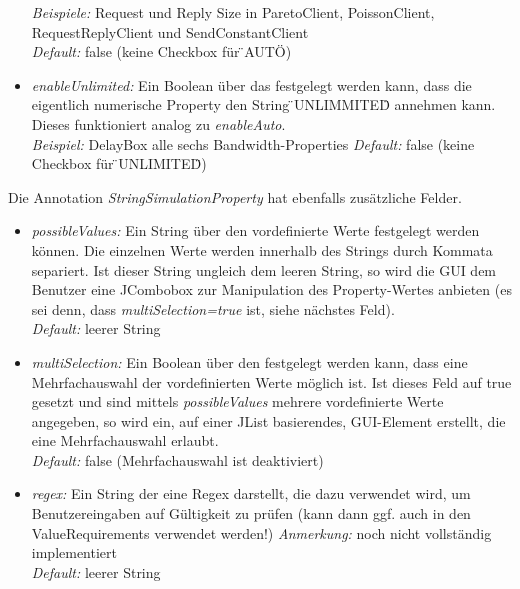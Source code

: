 \documentclass[a4paper, 11pt]{article} %
\begin{document}
\begin{itemize}
	\emph{Beispiele:} Request und Reply Size in ParetoClient, PoissonClient, RequestReplyClient und SendConstantClient\\
	\emph{Default:} false (keine Checkbox für \"{}AUTO\"{}) 
	\item \emph{enableUnlimited:} Ein Boolean über das festgelegt werden kann, dass die eigentlich numerische Property den String \"{}UNLIMMITED\"{} annehmen kann. Dieses funktioniert analog zu \emph{enableAuto}.\\
	\emph{Beispiel:} DelayBox alle sechs Bandwidth-Properties
	\emph{Default:} false (keine Checkbox für \"{}UNLIMITED\"{})
\end{itemize}

Die Annotation \emph{StringSimulationProperty} hat ebenfalls zusätzliche Felder.
\begin{itemize}
	\item \emph{possibleValues:} Ein String über den vordefinierte Werte festgelegt werden können. Die einzelnen Werte werden innerhalb des Strings durch Kommata separiert. Ist dieser String ungleich dem leeren String, so wird die GUI dem Benutzer eine JCombobox zur Manipulation des Property-Wertes anbieten (es sei denn, dass \emph{multiSelection=true} ist, siehe nächstes Feld).\\
	\emph{Default:} leerer String
	\item \emph{multiSelection:} Ein Boolean über den festgelegt werden kann, dass eine Mehrfachauswahl der vordefinierten Werte möglich ist. Ist dieses Feld auf true gesetzt und sind mittels \emph{possibleValues} mehrere vordefinierte Werte angegeben, so wird ein, auf einer JList basierendes, GUI-Element erstellt, die eine Mehrfachauswahl erlaubt.\\
	\emph{Default:} false (Mehrfachauswahl ist deaktiviert) 
	\item \emph{regex:} Ein String der eine Regex darstellt, die dazu verwendet wird, um Benutzereingaben auf Gültigkeit zu prüfen (kann dann ggf. auch in den ValueRequirements verwendet werden!)
	\emph{Anmerkung:} noch nicht vollständig implementiert\\
	\emph{Default:} leerer String
\end{itemize}

\end{document}
